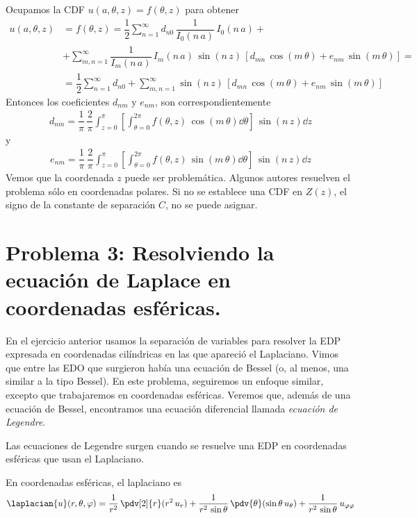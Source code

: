 Ocupamos la CDF $u(a, \theta, z) = f(\theta, z)$ para obtener
\begin{align*}
u(a, \theta, z) &= f(\theta, z) = \dfrac{1}{2} \sum_{n=1}^{\infty} d_{n0} \, \dfrac{1}{I_{0} (n \, a)} \, I_{0} (n \, a) + \\[0.5em]
&+ \sum_{m,n=1}^{\infty} \dfrac{1}{I_{m} (n \, a)} \, I_{m} (n \, a) \, \sin (n \, z) \, \left[ d_{mn} \, \cos (m \, \theta) + e_{nm} \, \sin (m \, \theta) \right] = \\[0.5em]
&= \dfrac{1}{2} \sum_{n=1}^{\infty} d_{n0} + \sum_{m,n=1}^{\infty} \sin (n \, z) \, \left[ d_{mn} \, \cos (m \, \theta) + e_{nm} \, \sin (m \, \theta) \right]
\end{align*}
Entonces los coeficientes $d_{nm}$ y $e_{nm}$, son correspondientemente
\begin{align*}
d_{nm} = \dfrac{1}{\pi} \, \dfrac{2}{\pi} \int_{z=0}^{\pi} \left[ \int_{\theta=0}^{2 \pi} f(\theta, z) \, \cos (m \, \theta) \dd{\theta} \right] \, \sin (n \, z) \dd{z}
\end{align*}
y
\begin{align*}
e_{nm} = \dfrac{1}{\pi} \, \dfrac{2}{\pi} \int_{z=0}^{\pi} \left[ \int_{\theta=0}^{2 \pi} f(\theta, z) \, \sin (m \, \theta) \dd{\theta} \right] \, \sin (n \, z) \dd{z}
\end{align*}
Vemos que la coordenada $z$ puede ser problemática. Algunos autores resuelven el problema sólo en coordenadas polares. Si no se establece una CDF en $Z (z)$, el signo de la constante de separación $C$, no se puede asignar.
\section{Problema 3: Resolviendo la ecuación de Laplace en coordenadas esféricas.}
En el ejercicio anterior usamos la separación de variables para resolver la EDP expresada en coordenadas cilíndricas en las que apareció el Laplaciano. Vimos que entre las EDO que surgieron había una ecuación de Bessel (o, al menos, una similar a la tipo Bessel). En este problema, seguiremos un enfoque similar, excepto que trabajaremos en coordenadas esféricas. Veremos que, además de una ecuación de Bessel, encontramos una ecuación diferencial llamada \emph{ecuación de Legendre}.
\par
Las ecuaciones de Legendre surgen cuando se resuelve una EDP en coordenadas esféricas que usan el Laplaciano. 
\par
En coordenadas esféricas, el laplaciano es
\begin{align*}
\laplacian{u} (r, \theta, \varphi) = \dfrac{1}{r^{2}} \, \pdv[2]{r} (r^{2} \, u_{r}) + \dfrac{1}{r^{2} \, \sin \theta} \, \pdv{\theta} (\sin \theta \, u_{\theta}) + \dfrac{1}{r^{2} \, \sin \theta} \, u_{\varphi \varphi}
\end{align*}

